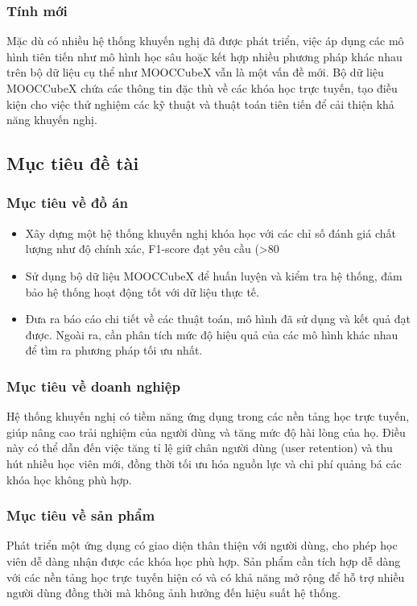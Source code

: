 \subsubsection{Tính mới}
Mặc dù có nhiều hệ thống khuyến nghị đã được phát triển, việc áp dụng các mô hình tiên tiến như mô hình học sâu hoặc kết hợp nhiều phương pháp khác nhau trên bộ dữ liệu cụ thể như MOOCCubeX vẫn là một vấn đề mới. Bộ dữ liệu MOOCCubeX chứa các thông tin đặc thù về các khóa học trực tuyến, tạo điều kiện cho việc thử nghiệm các kỹ thuật và thuật toán tiên tiến để cải thiện khả năng khuyến nghị.
\subsection{Mục tiêu đề tài}
\subsubsection{Mục tiêu về đồ án}
\begin{itemize}
    \item Xây dựng một hệ thống khuyến nghị khóa học với các chỉ số đánh giá chất lượng như độ chính xác, F1-score đạt yêu cầu (>80%
    \item Sử dụng bộ dữ liệu MOOCCubeX để huấn luyện và kiểm tra hệ thống, đảm bảo hệ thống hoạt động tốt với dữ liệu thực tế.
    \item Đưa ra báo cáo chi tiết về các thuật toán, mô hình đã sử dụng và kết quả đạt được. Ngoài ra, cần phân tích mức độ hiệu quả của các mô hình khác nhau để tìm ra phương pháp tối ưu nhất.
\end{itemize}
\subsubsection{Mục tiêu về doanh nghiệp}
Hệ thống khuyến nghị có tiềm năng ứng dụng trong các nền tảng học trực tuyến, giúp nâng cao trải nghiệm của người dùng và tăng mức độ hài lòng của họ. Điều này có thể dẫn đến việc tăng tỉ lệ giữ chân người dùng (user retention) và thu hút nhiều học viên mới, đồng thời tối ưu hóa nguồn lực và chi phí quảng bá các khóa học không phù hợp.
\subsubsection{Mục tiêu về sản phẩm}
Phát triển một ứng dụng có giao diện thân thiện với người dùng, cho phép học viên dễ dàng nhận được các khóa học phù hợp. Sản phẩm cần tích hợp dễ dàng với các nền tảng học trực tuyến hiện có và có khả năng mở rộng để hỗ trợ nhiều người dùng đồng thời mà không ảnh hưởng đến hiệu suất hệ thống.
